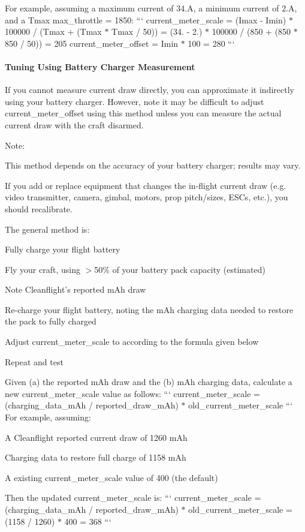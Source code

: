 For example, assuming a maximum current of 34.\+A, a minimum current of 2.\+A, and a Tmax {\ttfamily max\+\_\+throttle} = 1850\+: ``` current\+\_\+meter\+\_\+scale = (Imax -\/ Imin) $\ast$ 100000 / (Tmax + (Tmax $\ast$ Tmax / 50)) = (34. -\/ 2.) $\ast$ 100000 / (850 + (850 $\ast$ 850 / 50)) = 205 current\+\_\+meter\+\_\+offset = Imin $\ast$ 100 = 280 ``` \paragraph*{Tuning Using Battery Charger Measurement}

If you cannot measure current draw directly, you can approximate it indirectly using your battery charger. However, note it may be difficult to adjust {\ttfamily current\+\_\+meter\+\_\+offset} using this method unless you can measure the actual current draw with the craft disarmed.

Note\+:
\begin{DoxyItemize}
\item This method depends on the accuracy of your battery charger; results may vary.
\item If you add or replace equipment that changes the in-\/flight current draw (e.\+g. video transmitter, camera, gimbal, motors, prop pitch/sizes, E\+S\+Cs, etc.), you should recalibrate.
\end{DoxyItemize}

The general method is\+:


\begin{DoxyEnumerate}
\item Fully charge your flight battery
\item Fly your craft, using $>$50\% of your battery pack capacity (estimated)
\item Note Cleanflight's reported m\+Ah draw
\item Re-\/charge your flight battery, noting the m\+Ah charging data needed to restore the pack to fully charged
\item Adjust {\ttfamily current\+\_\+meter\+\_\+scale} to according to the formula given below
\item Repeat and test
\end{DoxyEnumerate}

Given (a) the reported m\+Ah draw and the (b) m\+Ah charging data, calculate a new {\ttfamily current\+\_\+meter\+\_\+scale} value as follows\+: ``` current\+\_\+meter\+\_\+scale = (charging\+\_\+data\+\_\+m\+Ah / reported\+\_\+draw\+\_\+m\+Ah) $\ast$ old\+\_\+current\+\_\+meter\+\_\+scale ``` For example, assuming\+:
\begin{DoxyItemize}
\item A Cleanflight reported current draw of 1260 m\+Ah
\item Charging data to restore full charge of 1158 m\+Ah
\item A existing {\ttfamily current\+\_\+meter\+\_\+scale} value of 400 (the default)
\end{DoxyItemize}

Then the updated {\ttfamily current\+\_\+meter\+\_\+scale} is\+: ``` current\+\_\+meter\+\_\+scale = (charging\+\_\+data\+\_\+m\+Ah / reported\+\_\+draw\+\_\+m\+Ah) $\ast$ old\+\_\+current\+\_\+meter\+\_\+scale = (1158 / 1260) $\ast$ 400 = 368 ``` 